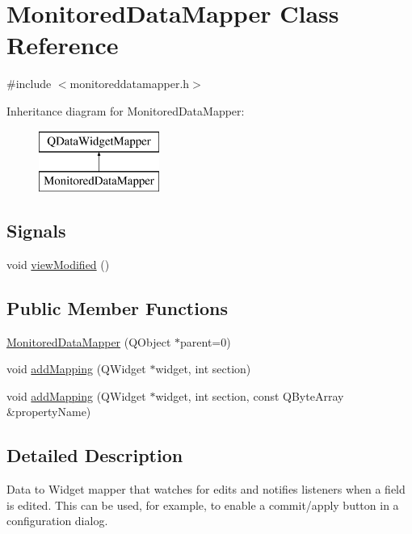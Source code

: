 \hypertarget{class_monitored_data_mapper}{}\section{Monitored\+Data\+Mapper Class Reference}
\label{class_monitored_data_mapper}


{\ttfamily \#include $<$monitoreddatamapper.\+h$>$}

Inheritance diagram for Monitored\+Data\+Mapper\+:\begin{figure}[H]
\begin{center}
\leavevmode
\includegraphics[height=2.000000cm]{class_monitored_data_mapper}
\end{center}
\end{figure}
\subsection*{Signals}
\begin{DoxyCompactItemize}
\item 
void \hyperlink{class_monitored_data_mapper_af1088f1181f9c77eb7d1d4be41a80ca8}{view\+Modified} ()
\end{DoxyCompactItemize}
\subsection*{Public Member Functions}
\begin{DoxyCompactItemize}
\item 
\hyperlink{class_monitored_data_mapper_a421f36fe4f05caf4345986a1a31aa258}{Monitored\+Data\+Mapper} (Q\+Object $\ast$parent=0)
\item 
void \hyperlink{class_monitored_data_mapper_a5ddfc6ef4e955211948c7b24994dfd7e}{add\+Mapping} (Q\+Widget $\ast$widget, int section)
\item 
void \hyperlink{class_monitored_data_mapper_af70ac6e3d3b891cadb8a4c4b8695d4cc}{add\+Mapping} (Q\+Widget $\ast$widget, int section, const Q\+Byte\+Array \&property\+Name)
\end{DoxyCompactItemize}


\subsection{Detailed Description}
Data to Widget mapper that watches for edits and notifies listeners when a field is edited. This can be used, for example, to enable a commit/apply button in a configuration dialog. 

